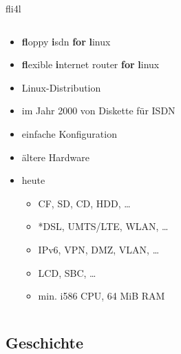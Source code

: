 \documentclass[t]{beamer}
\makeatletter
\newcommand{\strong}[1]{\@strong{#1}}
\newcommand{\@@strong}[1]{\textbf{\let\@strong\@@@strong#1}}
\newcommand{\@@@strong}[1]{\textnormal{\let\@strong\@@strong#1}}
\let\@strong\@@strong
\makeatother
\begin{document}
\begin{frame}{fli4l}
    \begin{columns}[T,onlytextwidth]
        \begin{column}{0.6\textwidth}
            \begin{itemize}
                \item \strong{fl}oppy \strong{i}sdn \strong{for} \strong{l}inux
                \item \strong{fl}exible \strong{i}nternet router \strong{for} \strong {l}inux
                \item Linux-Distribution
                \item im Jahr 2000 von Diskette für ISDN
                \item einfache Konfiguration
                \item ältere Hardware
                \item heute
                    \begin{itemize}
                        \item CF, SD, CD, HDD, …
                        \item *DSL, UMTS/LTE, WLAN, …
                        \item IPv6, VPN, DMZ, VLAN, …
                        \item LCD, SBC, …
                        \item min. i586 CPU, 64 MiB RAM
                    \end{itemize}
            \end{itemize}
        \end{column}
        \begin{column}{0.37\textwidth}
            \begin{figure}
                
            \end{figure}
        \end{column}
    \end{columns}
\end{frame}

\subsection{Geschichte}
\end{document}
